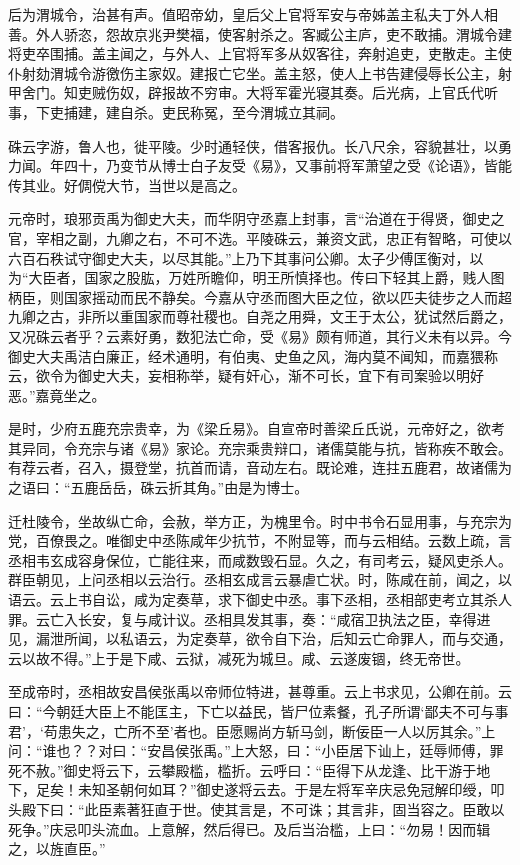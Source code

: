 \documentclass[12pt,UTF8]{ctexbook}
\begin{document}
后为渭城令，治甚有声。值昭帝幼，皇后父上官将军安与帝姊盖主私夫丁外人相善。外人骄恣，怨故京兆尹樊福，使客射杀之。客臧公主庐，吏不敢捕。渭城令建将吏卒围捕。盖主闻之，与外人、上官将军多从奴客往，奔射追吏，吏散走。主使仆射劾渭城令游徼伤主家奴。建报亡它坐。盖主怒，使人上书告建侵辱长公主，射甲舍门。知吏贼伤奴，辟报故不穷审。大将军霍光寝其奏。后光病，上官氏代听事，下吏捕建，建自杀。吏民称冤，至今渭城立其祠。



硃云字游，鲁人也，徙平陵。少时通轻侠，借客报仇。长八尺余，容貌甚壮，以勇力闻。年四十，乃变节从博士白子友受《易》，又事前将军萧望之受《论语》，皆能传其业。好倜傥大节，当世以是高之。



元帝时，琅邪贡禹为御史大夫，而华阴守丞嘉上封事，言“治道在于得贤，御史之官，宰相之副，九卿之右，不可不选。平陵硃云，兼资文武，忠正有智略，可使以六百石秩试守御史大夫，以尽其能。”上乃下其事问公卿。太子少傅匡衡对，以为“大臣者，国家之股肱，万姓所瞻仰，明王所慎择也。传曰下轻其上爵，贱人图柄臣，则国家摇动而民不静矣。今嘉从守丞而图大臣之位，欲以匹夫徒步之人而超九卿之古，非所以重国家而尊社稷也。自尧之用舜，文王于太公，犹试然后爵之，又况硃云者乎？云素好勇，数犯法亡命，受《易》颇有师道，其行义未有以异。今御史大夫禹洁白廉正，经术通明，有伯夷、史鱼之风，海内莫不闻知，而嘉猥称云，欲令为御史大夫，妄相称举，疑有奸心，渐不可长，宜下有司案验以明好恶。”嘉竟坐之。



是时，少府五鹿充宗贵幸，为《梁丘易》。自宣帝时善梁丘氏说，元帝好之，欲考其异同，令充宗与诸《易》家论。充宗乘贵辩口，诸儒莫能与抗，皆称疾不敢会。有荐云者，召入，摄登堂，抗首而请，音动左右。既论难，连拄五鹿君，故诸儒为之语曰：“五鹿岳岳，硃云折其角。”由是为博士。



迁杜陵令，坐故纵亡命，会赦，举方正，为槐里令。时中书令石显用事，与充宗为党，百僚畏之。唯御史中丞陈咸年少抗节，不附显等，而与云相结。云数上疏，言丞相韦玄成容身保位，亡能往来，而咸数毁石显。久之，有司考云，疑风吏杀人。群臣朝见，上问丞相以云治行。丞相玄成言云暴虐亡状。时，陈咸在前，闻之，以语云。云上书自讼，咸为定奏草，求下御史中丞。事下丞相，丞相部吏考立其杀人罪。云亡入长安，复与咸计议。丞相具发其事，奏：“咸宿卫执法之臣，幸得进见，漏泄所闻，以私语云，为定奏草，欲令自下治，后知云亡命罪人，而与交通，云以故不得。”上于是下咸、云狱，减死为城旦。咸、云遂废锢，终无帝世。



至成帝时，丞相故安昌侯张禹以帝师位特进，甚尊重。云上书求见，公卿在前。云曰：“今朝廷大臣上不能匡主，下亡以益民，皆尸位素餐，孔子所谓‘鄙夫不可与事君’，‘苟患失之，亡所不至’者也。臣愿赐尚方斩马剑，断佞臣一人以厉其余。”上问：“谁也？？对曰：“安昌侯张禹。”上大怒，曰：“小臣居下讪上，廷辱师傅，罪死不赦。”御史将云下，云攀殿槛，槛折。云呼曰：“臣得下从龙逢、比干游于地下，足矣！未知圣朝何如耳？”御史遂将云去。于是左将军辛庆忌免冠解印绶，叩头殿下曰：“此臣素著狂直于世。使其言是，不可诛；其言非，固当容之。臣敢以死争。”庆忌叩头流血。上意解，然后得已。及后当治槛，上曰：“勿易！因而辑之，以旌直臣。”
\end{document}
